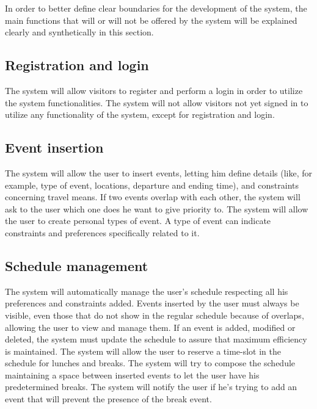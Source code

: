 In order to better define clear boundaries for the development of the system, the main functions that  will or will not be offered by the system will be explained clearly and synthetically in this section.

\subsection{Registration and login}
The system will allow visitors to register and perform a login in order to utilize the system functionalities. 
\newline
The system will not allow visitors not yet signed in to utilize any functionality of the system, except for registration and login.

\subsection{Event insertion}
The system will allow the user to insert events, letting him define details (like, for example, type of event, locations, departure and ending time), and constraints concerning travel means.
\newline
If two events overlap with each other, the system will ask to the user which one does he want to give priority to.
\newline
The system will allow the user to create personal types of event.
A type of event can indicate constraints and preferences specifically related to it.

\subsection{Schedule management}
The system will automatically manage the user's schedule respecting all his preferences and constraints added.
\newline
Events inserted by the user must always be visible, even those that do not show in the regular schedule because of overlaps, allowing the user to view and manage them.
\newline
If an event is added, modified or deleted, the system must update the schedule to assure that maximum efficiency is maintained.
\newline
The system will allow the user to reserve a time-slot in the schedule for lunches and breaks. 
\newline
The system will try to compose the schedule maintaining a space between inserted events to let the user have his predetermined breaks.
\newline
The system will notify the user if he's trying to add an event that will prevent the presence of the break event.

